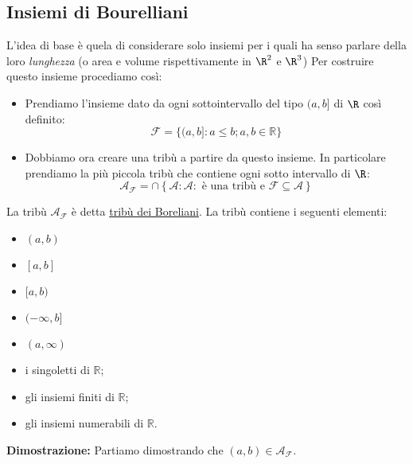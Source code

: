 \subsection{Insiemi di Bourelliani}
L'idea di base è quela di considerare solo insiemi per i quali ha senso parlare della loro \textit{lunghezza} (o area e volume rispettivamente in $ \R ^{2} $ e $ \R ^{3} $)
Per costruire questo insieme procediamo così:
\begin{itemize}
	\item Prendiamo l'insieme dato da ogni sottointervallo del tipo $ (a,b] $ di $ \R  $ così definito:
	      \[
		      \mathcal{F}=\{(a, b]: a \leq b ; a, b \in \mathbb{R}\}
	      \]
	\item Dobbiamo ora creare una tribù a partire da questo insieme. In particolare prendiamo la più piccola tribù che contiene ogni sotto intervallo di $ \R  $:
	      \[
		      \mathcal{A}_{\mathcal{F}} = \cap \left\{\mathcal{A}: \mathcal{A}: \text{ è una tribù e } \mathcal{F} \subseteq \mathcal{A} \right\}
	      \]
\end{itemize}
La tribù $ \mathcal{A}_{\mathcal{F}} $ è detta \underline{tribù dei Boreliani}. La tribù contiene i seguenti elementi:
\begin{itemize}
	\item $(a, b)$
	\item $[a, b]$
	\item $[a, b)$
	\item $(-\infty, b]$
	\item $(a, \infty)$
	\item i singoletti di $\mathbb{R}$;
	\item gli insiemi finiti di $\mathbb{R}$;
	\item gli insiemi numerabili di $\mathbb{R}$.
\end{itemize}
\textbf{Dimostrazione:}
Partiamo dimostrando che $ \left(a,b\right) \in \mathcal{A}_{\mathcal{F}} $.
